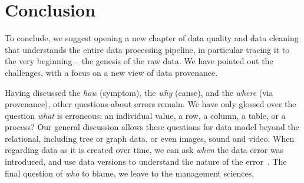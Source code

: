 \documentclass[11pt]{article}
\begin{document}
%
%
\section{Conclusion}
\label{sec:conc}

To conclude, we suggest opening a new chapter of data quality and data cleaning that understands the entire data processing pipeline, in particular tracing it to the very beginning -- the genesis of the raw data. We have pointed out the challenges, with a focus on a new view of data provenance. 

Having discussed the \emph{how} (symptom), the \emph{why} (cause), and the \emph{where} (via provenance), other questions about errors remain. We have only glossed over the question \emph{what} is erroneous: an individual value, a row, a column, a table, or a process? Our general discussion allows these questions for data model beyond the relational, including tree or graph data, or even images, sound and video. When regarding data as it is created over time, we can ask \emph{when} the data error was introduced, and use data versions to understand the nature of the error~\cite{bleifuss2018exploringchange}. The final question of \emph{who} to blame, we leave to the management sciences.




\end{document}
